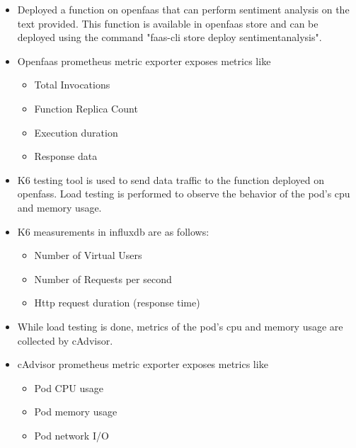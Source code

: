 \begin{itemize}
    \item Deployed a function on openfaas that can perform sentiment analysis on the text provided. This function is available in openfaas store and can be deployed using the command "faas-cli store deploy sentimentanalysis".
    \item Openfaas prometheus metric exporter exposes metrics like
    \begin{itemize}
        \item Total Invocations
        \item Function Replica Count
        \item Execution duration
        \item Response data
    \end{itemize}

    \item K6 testing tool is used to send data traffic to the function deployed on openfass. Load testing is performed to observe the behavior of the pod's cpu and memory usage.
    \item K6 measurements in influxdb are as follows:
    \begin{itemize}
        \item Number of Virtual Users
        \item Number of Requests per second
        \item Http request duration (response time)
    \end{itemize}

    \item While load testing is done, metrics of the pod's cpu and memory usage are collected by cAdvisor.
    \item cAdvisor prometheus metric exporter exposes metrics like
    \begin{itemize}
        \item Pod CPU usage
        \item Pod memory usage
        \item Pod network I/O
    \end{itemize}
\end{itemize}

